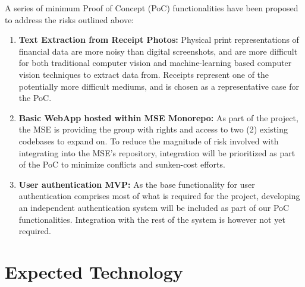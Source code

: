 \documentclass{article}
\begin{document}
A series of minimum Proof of Concept (PoC) functionalities have been proposed to address the risks outlined above:
\begin {enumerate}
  \item \textbf{Text Extraction from Receipt Photos:} Physical print representations of financial data are more noisy than digital screenshots, and are more difficult
  for both traditional computer vision and machine-learning based computer vision techniques to extract data from. Receipts represent one of the potentially more
  difficult mediums, and is chosen as a representative case for the PoC.
  \item \textbf{Basic WebApp hosted within MSE Monorepo:} As part of the project, the MSE is providing the group with rights and access to two (2) existing codebases to
  expand on. To reduce the magnitude of risk involved with integrating into the MSE's repository, integration will be prioritized as part of the PoC to minimize conflicts and
  sunken-cost efforts.
  \item \textbf{User authentication MVP:} As the base functionality for user authentication comprises most of what is required for the project, developing an independent
  authentication system will be included as part of our PoC functionalities. Integration with the rest of the system is however not yet required.
\end {enumerate}


\section{Expected Technology}


\end{document}
